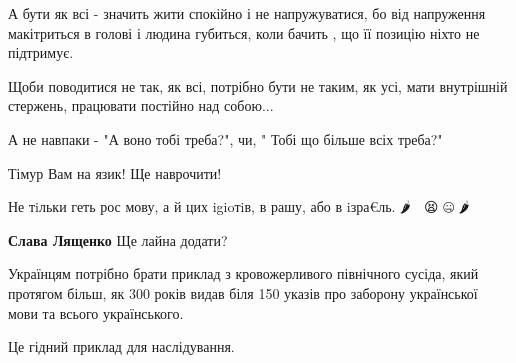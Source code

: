 \begin{itemize}
\begin{itemize}
А бути як всі - значить жити спокійно і не напружуватися, бо від напруження
макітриться в голові і людина губиться, коли бачить , що її позицію ніхто не
підтримує.

Щоби поводитися не так, як всі, потрібно бути не таким, як усі, мати внутрішній
стержень, працювати постійно над собою...

А не навпаки - "А воно тобі треба?", чи, " Тобі що більше всіх треба?"


 
Тімур Вам на язик! Ще наврочити!

\end{itemize}

 

Не тiльки геть рос мову, а й цих igioтiв, в рашу, або в iзра€ль. 🌶️ 🐷 😫 🤐 🌶️
💯

\begin{itemize}
 
\textbf{Слава Лященко}
Ще лайна додати?
\end{itemize}

 

Українцям потрібно брати приклад з кровожерливого північного сусіда, який
протягом більш, як 300 років видав біля 150 указів про заборону української
мови та всього українського.

Це гідний приклад для наслідування.


 


\end{itemize}
